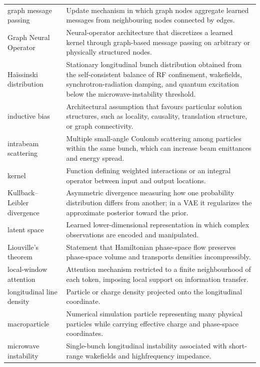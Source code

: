 \begin{longtable}{@{}p{}@{}p{}@{}}
\noalign{\vskip\baselineskip}
graph message passing & Update mechanism in which graph nodes aggregate learned messages from neighbouring nodes connected by edges.\\
Graph Neural Operator & Neural-operator architecture that discretizes a learned kernel through graph-based message passing on arbitrary or physically structured nodes.\\
\noalign{\vskip\baselineskip}
Haïssinski distribution & Stationary longitudinal bunch distribution obtained from the self-consistent balance of RF confinement, wakefields, synchrotron-radiation damping, and quantum excitation below the microwave-instability threshold.\\
\noalign{\vskip\baselineskip}
inductive bias & Architectural assumption that favours particular solution structures, such as locality, causality, translation structure, or graph connectivity.\\
intrabeam scattering & Multiple small-angle Coulomb scattering among particles within the same bunch, which can increase beam emittances and energy spread.\\
\noalign{\vskip\baselineskip}
kernel & Function defining weighted interactions or an integral operator between input and output locations.\\
Kullback–Leibler divergence & Asymmetric divergence measuring how one probability distribution differs from another; in a VAE it regularizes the approximate posterior toward the prior.\\
\noalign{\vskip\baselineskip}
latent space & Learned lower-dimensional representation in which complex observations are encoded and manipulated.\\
Liouville’s theorem & Statement that Hamiltonian phase-space flow preserves phase-space volume and transports densities incompressibly.\\
local-window attention & Attention mechanism restricted to a finite neighbourhood of each token, imposing local support on information transfer.\\
longitudinal line density & Particle or charge density projected onto the longitudinal coordinate.\\
\noalign{\vskip\baselineskip}
macroparticle & Numerical simulation particle representing many physical particles while carrying effective charge and phase-space coordinates.\\
microwave instability & Single-bunch longitudinal instability associated with short-range wakefields and highfrequency impedance.\\

\end{longtable}
